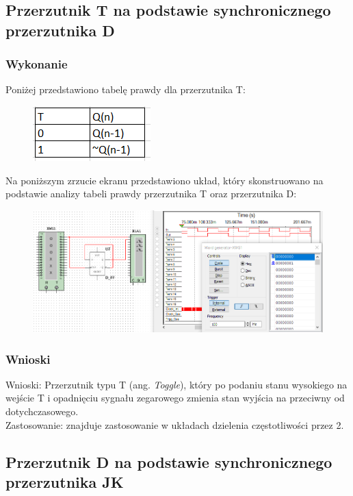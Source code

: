 \documentclass[12pt,a4paper]{article}
\begin{document}
\subsection{Przerzutnik T na podstawie synchronicznego przerzutnika D}
\subsubsection{Wykonanie}
Poniżej przedstawiono tabelę prawdy dla przerzutnika T:

\begin{figure}[H]
\centering
\includegraphics{img/3eTruthTable}
\end{figure}

Na poniższym zrzucie ekranu przedstawiono układ, który skonstruowano na podstawie analizy tabeli prawdy przerzutnika T oraz przerzutnika D:

\begin{figure}[H]
\centering
\includegraphics[width=\textwidth]{img/3e}
\end{figure}

\subsubsection{Wnioski}

Wnioski: Przerzutnik typu T (ang. \textit{Toggle}), który po podaniu stanu wysokiego na wejście T i opadnięciu sygnału zegarowego zmienia stan wyjścia na przeciwny od dotychczasowego.\\
Zastosowanie: znajduje zastosowanie w układach dzielenia częstotliwości przez 2.

\subsection{Przerzutnik D na podstawie synchronicznego przerzutnika JK}
\end{document}
